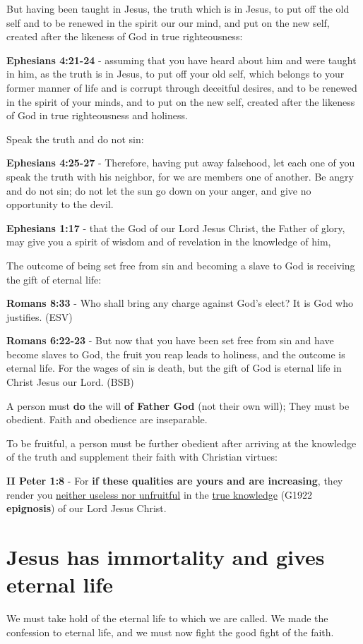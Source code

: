 \documentclass[11pt]{article}
\begin{document}
But having been taught in Jesus, the truth which is in Jesus, to put off the old self and to be renewed in the spirit our our mind, and put on the new self, created after the likeness of God in true righteousness:

\textbf{Ephesians 4:21-24} - assuming that you have heard about him and were taught in him, as the truth is in Jesus, to put off your old self, which belongs to your former manner of life and is corrupt through deceitful desires, and to be renewed in the spirit of your minds, and to put on the new self, created after the likeness of God in true righteousness and holiness.

Speak the truth and do not sin:

\textbf{Ephesians 4:25-27} - Therefore, having put away falsehood, let each one of you speak the truth with his neighbor, for we are members one of another. Be angry and do not sin; do not let the sun go down on your anger, and give no opportunity to the devil.

\textbf{Ephesians 1:17} - that the God of our Lord Jesus Christ, the Father of glory, may give you a spirit of wisdom and of revelation in the knowledge of him,

The outcome of being set free from sin and becoming a slave to God is receiving the gift of eternal life:

\textbf{Romans 8:33} -  Who shall bring any charge against God's elect?  It is God who justifies.  (ESV)

\textbf{Romans 6:22-23} - But now that you have been set free from sin and have become slaves to God, the fruit you reap leads to holiness, and the outcome is eternal life. For the wages of sin is death, but the gift of God is eternal life in Christ Jesus our Lord. (BSB)

A person must \textbf{do} the will \textbf{of Father God} (not their own will); They must be obedient.
Faith and obedience are inseparable.

To be fruitful, a person must be further obedient after arriving at the knowledge of the truth and supplement their faith with Christian virtues:

\textbf{II Peter 1:8} - For \textbf{if these qualities are yours and are increasing}, they render you \uline{neither useless nor unfruitful} in the \uline{true knowledge} (G1922 \textbf{epignosis}) of our Lord Jesus Christ.

\section{Jesus has immortality and gives eternal life}
\label{sec:orgd044382}
We must take hold of the eternal life to which we are called.
We made the confession to eternal life, and we must now fight the good fight of the faith.
\end{document}
